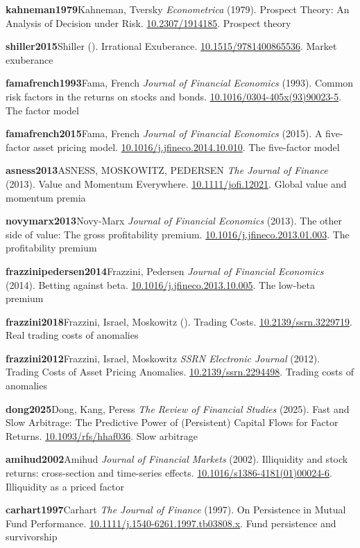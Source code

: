 \noindent\textbf{kahneman1979}\quad Kahneman, Tversky \emph{Econometrica} (1979). Prospect Theory: An Analysis of Decision under Risk. \url{10.2307/1914185}. Prospect theory\par
\noindent\textbf{shiller2015}\quad Shiller \emph{} (). Irrational Exuberance. \url{10.1515/9781400865536}. Market exuberance\par
\noindent\textbf{famafrench1993}\quad Fama, French \emph{Journal of Financial Economics} (1993). Common risk factors in the returns on stocks and bonds. \url{10.1016/0304-405x(93)90023-5}. The factor model\par
\noindent\textbf{famafrench2015}\quad Fama, French \emph{Journal of Financial Economics} (2015). A five-factor asset pricing model. \url{10.1016/j.jfineco.2014.10.010}. The five-factor model\par
\noindent\textbf{asness2013}\quad ASNESS, MOSKOWITZ, PEDERSEN \emph{The Journal of Finance} (2013). Value and Momentum Everywhere. \url{10.1111/jofi.12021}. Global value and momentum premia\par
\noindent\textbf{novymarx2013}\quad Novy-Marx \emph{Journal of Financial Economics} (2013). The other side of value: The gross profitability premium. \url{10.1016/j.jfineco.2013.01.003}. The profitability premium\par
\noindent\textbf{frazzinipedersen2014}\quad Frazzini, Pedersen \emph{Journal of Financial Economics} (2014). Betting against beta. \url{10.1016/j.jfineco.2013.10.005}. The low-beta premium\par
\noindent\textbf{frazzini2018}\quad Frazzini, Israel, Moskowitz \emph{} (). Trading Costs. \url{10.2139/ssrn.3229719}. Real trading costs of anomalies\par
\noindent\textbf{frazzini2012}\quad Frazzini, Israel, Moskowitz \emph{SSRN Electronic Journal} (2012). Trading Costs of Asset Pricing Anomalies. \url{10.2139/ssrn.2294498}. Trading costs of anomalies\par
\noindent\textbf{dong2025}\quad Dong, Kang, Peress \emph{The Review of Financial Studies} (2025). Fast and Slow Arbitrage: The Predictive Power of (Persistent) Capital Flows for Factor Returns. \url{10.1093/rfs/hhaf036}. Slow arbitrage\par
\noindent\textbf{amihud2002}\quad Amihud \emph{Journal of Financial Markets} (2002). Illiquidity and stock returns: cross-section and time-series effects. \url{10.1016/s1386-4181(01)00024-6}. Illiquidity as a priced factor\par
\noindent\textbf{carhart1997}\quad Carhart \emph{The Journal of Finance} (1997). On Persistence in Mutual Fund Performance. \url{10.1111/j.1540-6261.1997.tb03808.x}. Fund persistence and survivorship\par
